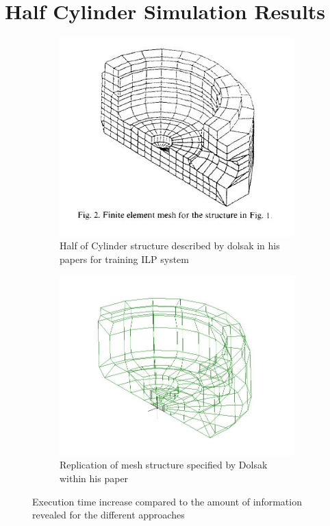 \section{Half Cylinder Simulation Results}
\begin{figure}[H]
\centering
\begin{subfigure}{.5\textwidth}
  \centering
  \includegraphics[width=0.9\linewidth]{../Graphics/DolsakCylinderMeshed.jpeg}
  \caption{Half of Cylinder structure described by dolsak in his papers for training ILP system}
  \label{fig:sub1}
\end{subfigure}%
\begin{subfigure}{.5\textwidth}
  \centering
  \includegraphics[width=0.9\linewidth]{../Graphics/DolsakCylinderWithinLisa.jpeg}
  \caption{Replication of mesh structure specified by Dolsak within his paper \cite{Dolsak91}}
  \label{fig:sub2}
\end{subfigure}
\label{fig:test}
  \caption{Execution time increase compared to the amount of information revealed for the different approaches}
 \end{figure}



